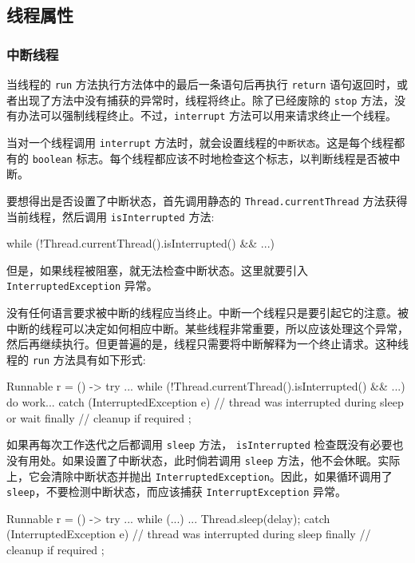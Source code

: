 \subsection{线程属性}

\subsubsection{中断线程}

当线程的 \texttt{run} 方法执行方法体中的最后一条语句后再执行 \texttt{return} 语句返回时，或者出现了方法中没有捕获的异常时，线程将终止。除了已经废除的 \texttt{stop} 方法，没有办法可以强制线程终止。不过，\texttt{interrupt} 方法可以用来请求终止一个线程。

当对一个线程调用 \texttt{interrupt} 方法时，就会设置线程的\texttt{中断状态}。这是每个线程都有的 \texttt{boolean} 标志。每个线程都应该不时地检查这个标志，以判断线程是否被中断。

要想得出是否设置了中断状态，首先调用静态的 \texttt{Thread.currentThread} 方法获得当前线程，然后调用 \texttt{isInterrupted} 方法:

\begin{Java}
while (!Thread.currentThread().isInterrupted() && ...)
\end{Java}

但是，如果线程被阻塞，就无法检查中断状态。这里就要引入 \texttt{InterruptedException} 异常。

没有任何语言要求被中断的线程应当终止。中断一个线程只是要引起它的注意。被中断的线程可以决定如何相应中断。某些线程非常重要，所以应该处理这个异常，然后再继续执行。但更普遍的是，线程只需要将中断解释为一个终止请求。这种线程的 \texttt{run} 方法具有如下形式:

\begin{Java}
Runnable r = () -> {
    try {
        ...
        while (!Thread.currentThread().isInterrupted() && ...) {
            do work...
        }
    } catch (InterruptedException e) {
        // thread was interrupted during sleep or wait
    } finally {
        // cleanup if required
    }
};
\end{Java}

如果再每次工作迭代之后都调用 \texttt{sleep} 方法， \texttt{isInterrupted} 检查既没有必要也没有用处。如果设置了中断状态，此时倘若调用 \texttt{sleep} 方法，他不会休眠。实际上，它会清除中断状态并抛出 \texttt{InterruptedException}。因此，如果循环调用了 \texttt{sleep}，不要检测中断状态，而应该捕获 \texttt{InterruptException} 异常。

\begin{Java}
Runnable r = () -> {
    try {
        ...
        while (...) {
            ...
            Thread.sleep(delay);
        }
    } catch (InterruptedException e) {
        // thread was interrupted during sleep
    } finally {
        // cleanup if required
    }
};
\end{Java}

